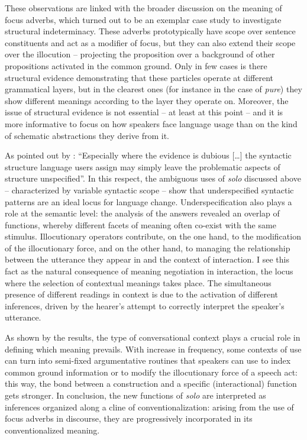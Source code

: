 These observations are linked with the broader discussion on the meaning of focus adverbs, which turned out to be an exemplar case study to investigate structural indeterminacy. These adverbs prototypically have scope over sentence constituents and act as a modifier of focus, but they can also extend their scope over the illocution – projecting the proposition over a background of other propositions activated in the common ground. Only in few cases is there structural evidence demonstrating that these particles operate at different grammatical layers, but in the clearest ones (for instance in the case of \textit{pure}) they show different meanings according to the layer they operate on. Moreover, the issue of structural evidence is not essential – at least at this point – and it is more informative to focus on how speakers face language usage than on the kind of schematic abstractions they derive from it.

As pointed out by \citet[43]{Smet2014}: “Especially where the evidence is dubious […] the syntactic structure language users assign may simply leave the problematic aspects of structure unspecified”. In this respect, the ambiguous uses of \textit{solo} discussed above – characterized by variable syntactic scope – show that underspecified syntactic patterns are an ideal locus for language change. Underspecification also plays a role at the semantic level: the analysis of the answers revealed an overlap of functions, whereby different facets of meaning often co-exist with the same stimulus. Illocutionary operators contribute, on the one hand, to the modification of the illocutionary force, and on the other hand, to managing the relationship between the utterance they appear in and the context of interaction. I see this fact as the natural consequence of meaning negotiation in interaction, the locus where the selection of contextual meanings takes place. The simultaneous presence of different readings in context is due to the activation of different inferences, driven by the hearer’s attempt to correctly interpret the speaker’s utterance.

As shown by the results, the type of conversational context plays a crucial role in defining which meaning prevails. With increase in frequency, some contexts of use can turn into semi-fixed argumentative routines that speakers can use to index common ground information or to modify the illocutionary force of a speech act: this way, the bond between a construction and a specific (interactional) function gets stronger. In conclusion, the new functions of \textit{solo} are interpreted as inferences organized along a cline of conventionalization: arising from the use of focus adverbs in discourse, they are progressively incorporated in its conventionalized meaning.

